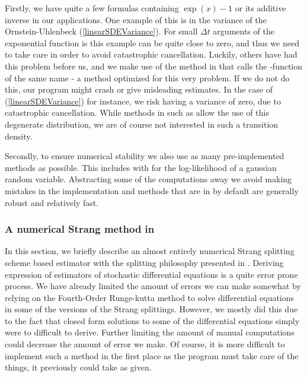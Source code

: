 Firstly, we have quite a few formulas containing $\exp\left(x\right) - 1$ or its additive inverse in our applications. One example of this is in the variance of the Ornstein-Uhlenbeck (\ref{linearSDEVariance}). For small $\Delta t$ arguments of the exponential function is this example can be quite close to zero, and thus we need to take care in order to avoid catastrophic cancellation. Luckily, others have had this problem before us, and we make use of the  method in  that calls the -function of the same name - a method optimized for this very problem. \cite{cppreference_expm1} If we do not do this, our program might crash or give misleading estimates. In the case of (\ref{linearSDEVariance}) for instance, we risk having a variance of zero, due to catastrophic cancellation. While methods in  such as  allow the use of this degenerate distribution, we are of course not interested in such a transition density.

Secondly, to ensure numerical stability we also use as many pre-implemented methods as possible. This includes  with  for the log-likelihood of a gaussian random variable. Abstracting some of the computations away we avoid making mistakes in the implementation and methods that are in  by default are generally robust and relatively fast.
\subsubsection{A numerical Strang method in }\label{subsection:NumericalStrangSplitting}
In this section, we briefly describe an almost entirely numerical Strang splitting scheme based estimator with the splitting philosophy presented in \cite{SplittingSchemes}. Deriving expression of estimators of stochastic differential equations is a quite error prone process. We have already limited the amount of errors we can make somewhat by relying on the Fourth-Order Runge-kutta method to solve differential equations in some of the versions of the Strang splittings. However, we mostly did this due to the fact that closed form solutions to some of the differential equations simply were to difficult to derive. Further limiting the amount of manual computations could decrease the amount of error we make. Of course, it is more difficult to implement such a method in the first place as the program must take care of the things, it previously could take as given.

